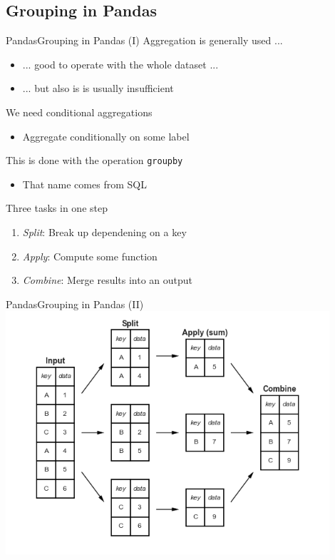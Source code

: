 \documentclass[10pt,compress]{beamer} %
\begin{document}
\subsection{Grouping in Pandas}
\begin{frame}{Pandas}{Grouping in Pandas (I)}
		Aggregation is generally used ...
		\begin{itemize}
			\item ... good to operate with the whole dataset ...
			\item ... but also is is usually insufficient
		\end{itemize}
		We need conditional aggregations
		\begin{itemize}
			\item Aggregate conditionally on some label
		\end{itemize}
		This is done with the operation \texttt{groupby}
		\begin{itemize}
			\item That name comes from SQL
		\end{itemize}
		Three tasks in one step
		\begin{enumerate}
			\item \textit{Split}: Break up dependening on a key
			\item \textit{Apply}: Compute some function
			\item \textit{Combine}: Merge results into an output
		\end{enumerate}
\end{frame}

\begin{frame}{Pandas}{Grouping in Pandas (II)}
	\centering \includegraphics[width=0.9\textwidth]{figs/03.08-split-apply-combine.png}\\
\end{frame}
\end{document}
